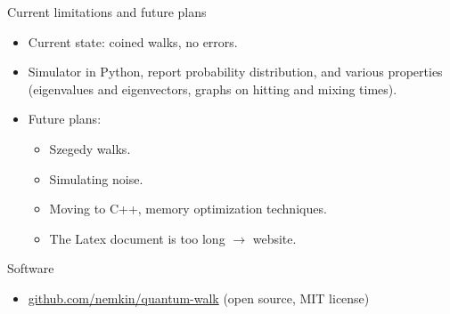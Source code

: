 \documentclass[aspectratio=169]{beamer}
\begin{document}
\begin{frame}{Current limitations and future plans}
\begin{itemize}
    \item Current state: coined walks, no errors.
    \item Simulator in Python, report probability distribution, and various properties (eigenvalues and eigenvectors, graphs on hitting and mixing times).
    \item Future plans:
    \begin{itemize}
        \item Szegedy walks.
        \item Simulating noise.
        \item Moving to C++, memory optimization techniques.
        
        \item The Latex document is too long $\rightarrow$ website.
    \end{itemize}
\end{itemize}
\end{frame}

\begin{frame}{Software}
\begin{itemize}
    \item \url{github.com/nemkin/quantum-walk} (open source, MIT license)
\end{itemize}
\end{frame}
\end{document}
